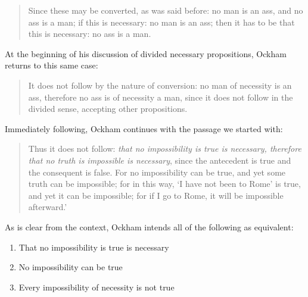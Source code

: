 	\begin{quote}
		Since these may be converted, as was said before: no man is an ass, and no ass is a man; if this is necessary: no man is an ass; then it has to be that this is necessary: no ass is a man. \cite[II. 24, p. 328]{OckhamSL} 
	\end{quote}
	
	At the beginning of his discussion of divided necessary propositions, Ockham returns to this same case:
	
	\begin{quote}
		It does not follow by the nature of conversion: no man of necessity is an ass, therefore no ass is of necessity a man, since it does not follow in the divided sense, accepting other propositions. \cite[II. 24, p. 329]{OckhamSL}
	\end{quote}
	
	Immediately following, Ockham continues with the passage we started with:
	\begin{quote}
		Thus it does not follow: \textit{that no impossibility is true is necessary, therefore that no truth is impossible is necessary}, since the antecedent is true and the consequent is false. For no impossibility can be true, and yet some truth can be impossible; for in this way, `I have not been to Rome' is true, and yet it can be impossible; for if I go to Rome, it will be impossible afterward.' \cite[II. 24, p. 329]{OckhamSL}
	\end{quote}
	
	As is clear from the context, Ockham intends all of the following as equivalent: 
	\begin{enumerate}
		\item That no impossibility is true is necessary
		
		\item No impossibility can be true
		
		\item Every impossibility of necessity is not true
	\end{enumerate}
	
